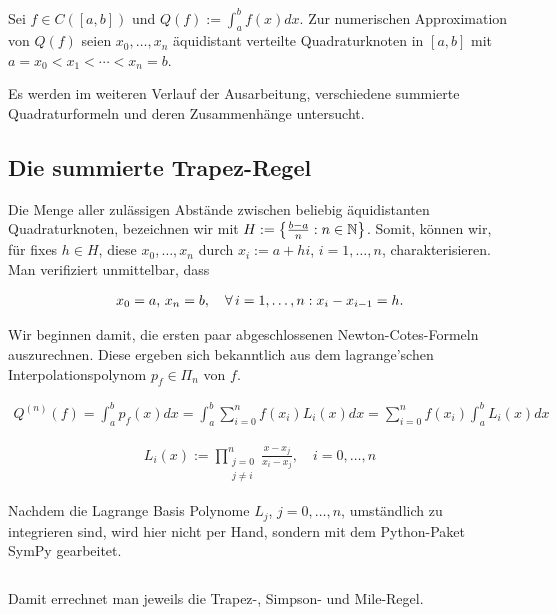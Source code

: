 Sei $f \in C([a, b])$ und $Q(f) := \int_a^b f(x) dx$. Zur numerischen Approximation von $Q(f)$ seien $x_0, \ldots, x_n$ äquidistant verteilte Quadraturknoten in $[a, b]$ mit $a = x_0 < x_1 < \cdots < x_n = b$.

Es werden im weiteren Verlauf der Ausarbeitung, verschiedene summierte Quadraturformeln und deren Zusammenhänge untersucht.

\subsection{Die summierte Trapez-Regel}

Die Menge aller zulässigen Abstände zwischen beliebig äquidistanten Quadraturknoten, bezeichnen wir mit $H := \left \{ \frac{b-a}{n}: n \in \mathbb{N} \right \}$. Somit, können wir, für fixes $h \in H$, diese $x_0, \ldots, x_n$ durch $x_i := a + hi$, $i = 1, \ldots, n$, charakterisieren. Man verifiziert unmittelbar, dass

\begin{align*}
    x_0 = a, \,
    x_n = b, \quad
    \forall \, i = 1, \ldots, n:
    x_i - x_{i-1} = h.
\end{align*}

Wir beginnen damit, die ersten paar abgeschlossenen Newton-Cotes-Formeln auszurechnen. Diese ergeben sich bekanntlich aus dem lagrange'schen Interpolationspolynom $p_f \in \Pi_n$ von $f$.

\begin{align*}
    Q^{(n)}(f)
    = \int_a^b p_f(x) dx
    = \int_a^b \sum_{i=0}^n f(x_i) L_i(x) dx
    = \sum_{i=0}^n f(x_i) \int_a^b L_i(x) dx
\end{align*}

\begin{align*}
    L_i(x) :=
    \prod_{\substack{j=0 \\ j \neq i}}^n
    \frac{x - x_j}{x_i - x_j}, \quad
    i = 0, \ldots, n
\end{align*}

Nachdem die Lagrange Basis Polynome $L_j$, $j = 0, \ldots, n$, umständlich zu integrieren sind, wird hier nicht per Hand, sondern mit dem Python-Paket SymPy gearbeitet.

\inputminted{python}{Aufgabe_2/python_code/newton_cotes_formeln.py}

Damit errechnet man jeweils die Trapez-, Simpson- und Mile-Regel.



